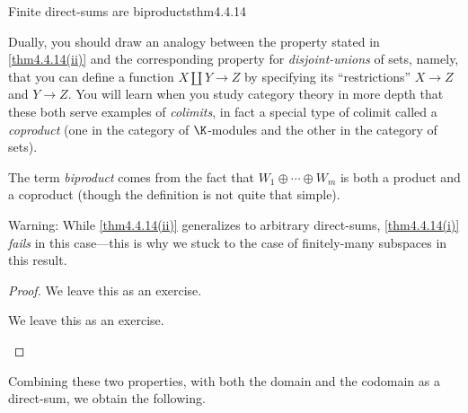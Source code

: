 \begin{thm}{Finite direct-sums are biproducts}{thm4.4.14}
\begin{rmk}
		Dually, you should draw an analogy between the property stated in \cref{thm4.4.14(ii)} and the corresponding property for \emph{disjoint-unions} of sets, namely, that you can define a function $X\coprod Y\rightarrow Z$ by specifying its ``restrictions'' $X\rightarrow Z$ and $Y\rightarrow Z$.  You will learn when you study category theory in more depth that these both serve examples of \emph{colimits}, in fact a special type of colimit called a \emph{coproduct} (one in the category of $\K$-modules and the other in the category of sets).
	\end{rmk}
	\begin{rmk}
		The term \emph{biproduct} comes from the fact that $W_1\oplus \cdots \oplus W_m$ is both a product and a coproduct (though the definition is not quite that simple).
	\end{rmk}
	\begin{rmk}
		Warning:  While \cref{thm4.4.14(ii)} generalizes to arbitrary direct-sums, \cref{thm4.4.14(i)} \emph{fails} in this case---this is why we stuck to the case of finitely-many subspaces in this result.
	\end{rmk}
	\begin{proof}
		We leave this as an exercise.
		\begin{exr}[breakable=false]{}{}
			We leave this as an exercise.
		\end{exr}
	\end{proof}
\end{thm}
Combining these two properties, with both the domain and the codomain as a direct-sum, we obtain the following.
